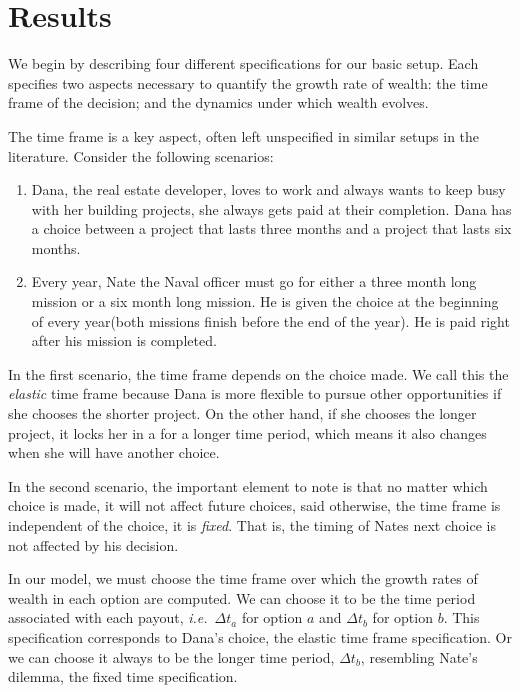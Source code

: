 \documentclass[11pt]{article}
\newcommand{\ie}{{\it i.e.}\ }
\newcommand{\Dt}{\Delta t}
\numberwithin{equation}{section}
\begin{document}
\section{Results}\label{sec:results}

We begin by describing four different specifications for our basic setup. Each specifies two aspects necessary to quantify the growth rate of wealth: the time frame of the decision; and the dynamics under which wealth evolves.

The time frame is a key aspect, often left unspecified in similar setups in the literature. Consider the following scenarios:

\begin{enumerate}
    \item Dana, the real estate developer, loves to work and always wants to keep busy with her building projects, she always gets paid at their completion. Dana has a choice between a project that lasts three months and a project that lasts six months. 
    \item Every year, Nate the Naval officer must go for either a three month long mission or a six month long mission. He is given the choice at the beginning of every year(both missions finish before the end of the year). He is paid right after his mission is completed.
\end{enumerate}

In the first scenario, the time frame depends on the choice made. We call this the \textit{elastic} time frame because Dana is more flexible to pursue other opportunities if she chooses the shorter project. On the other hand, if she chooses the longer project, it locks her in a for a longer time period, which means it also changes when she will have another choice.  

In the second scenario, the important element to note is that no matter which choice is made, it will not affect future choices, said otherwise, the time frame is independent of the choice, it is \textit{fixed}. That is, the timing of Nates next choice is not affected by his decision. 

In our model, we must choose the time frame over which the growth rates of wealth in each option are computed. We can choose it to be the time period associated with each payout, \ie $\Dt_a$ for option $a$ and $\Dt_b$ for option $b$. This specification corresponds to Dana's choice, the elastic time frame specification. Or we can choose it always to be the longer time period, $\Dt_b$, resembling Nate's dilemma, the fixed time specification. 
\end{document}
